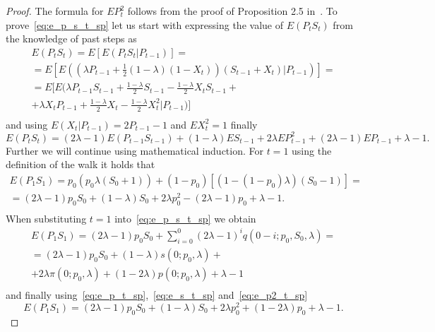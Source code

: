 \documentclass[runningheads]{CMSIM}
\begin{document}
    \begin{proof}
        The formula for $EP_{t}^{2}$ follows from the proof of Proposition
        2.5 in~\cite{ja2019apmat}.
        To prove~\eqref{eq:e_p_s_t_sp} let us
        start with expressing the value of $E(P_{t}S_{t})$ from the knowledge
        of past steps as
        \begin{gather*}
            E(P_{t}S_{t})=E[E(P_{t}S_{t}|P_{t-1})]=\\
            =E[E((\lambda P_{t-1}+\frac{1}{2}(1-\lambda)(1-X_{t}))(S_{t-1}+X_{t})|P_{t-1})]=\\
            =E[E(\lambda P_{t-1}S_{t-1}+\frac{1-\lambda}{2}S_{t-1}-\frac{1-\lambda}{2}X_{t}S_{t-1}+\\
                +\lambda X_{t}P_{t-1}+\frac{1-\lambda}{2}X_{t}-\frac{1-\lambda}{2}X_{t}^{2}|P_{t-1})]\\
        \end{gather*}
        and using $E(X_{t}|P_{t-1})=2P_{t-1}-1$ and $EX_{t}^{2}=1$ finally
        \begin{equation}
            E(P_{t}S_{t})=(2\lambda-1)E(P_{t-1}S_{t-1})+(1-\lambda)ES_{t-1}+2\lambda EP_{t-1}^{2}+(2\lambda-1)EP_{t-1}+\lambda-1.\label{eq:e_p_s_t-1_t_sp}
        \end{equation}
        Further we will continue using mathematical induction.
        For $t=1$
        using the definition of the walk it holds that
        \begin{gather*}
            E(P_{1}S_{1})=p_{0}(p_{0}\lambda(S_{0}+1))+(1-p_{0})[(1-(1-p_{0})\lambda)(S_{0}-1)]=\\
            =(2\lambda-1)p_{0}S_{0}+(1-\lambda)S_{0}+2\lambda p_{0}^{2}-(2\lambda-1)p_{0}+\lambda-1.\\
        \end{gather*}
        When substituting $t=1$ into~\eqref{eq:e_p_s_t_sp} we obtain
        \begin{gather*}
            E(P_{1}S_{1})=(2\lambda-1)p_{0}S_{0}+\sum_{i=0}^{0}(2\lambda-1)^{i}q(0-i;p_{0},S_{0},\lambda)=\\
            =(2\lambda-1)p_{0}S_{0}+(1-\lambda)s(0;p_{0},\lambda)+\\
            +2\lambda\pi(0;p_{0},\lambda)+(1-2\lambda)p(0;p_{0},\lambda)+\lambda-1\\
        \end{gather*}
        and finally using~\eqref{eq:e_p_t_sp},~\eqref{eq:e_s_t_sp} and~\eqref{eq:e_p2_t_sp}
        \[
            E(P_{1}S_{1})=(2\lambda-1)p_{0}S_{0}+(1-\lambda)S_{0}+2\lambda p_{0}^{2}+(1-2\lambda)p_{0}+\lambda-1.
\]
\end{proof}
\end{document}
